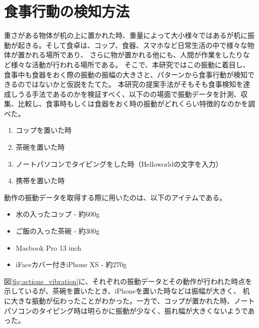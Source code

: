 \section{食事行動の検知方法}

重さがある物体が机の上に置かれた時、重量によって大小様々ではあるが机に振動が起きる。そして食卓は、コップ、食器、スマホなど日常生活の中で様々な物体が置かれる場所であり、
さらに物が置かれる他にも、人間が作業をしたりなど様々な活動が行われる場所である。
そこで、本研究ではこの振動に着目し、食事中も食器をおく際の振動の振幅の大きさと、パターンから食事行動が検知できるのではないかと仮説をたてた。
本研究の提案手法がそもそも食事検知を達成しうる手法であるのかを検証すべく、以下のの場面で振動データを計測、収集、比較し、食事時もしくは食器をおく時の振動がどれくらい特徴的なのかを調べた。

\begin{enumerate}
  \item コップを置いた時
  \item 茶碗を置いた時
  \item ノートパソコンでタイピングをした時（Helloworldの文字を入力）
  \item 携帯を置いた時
\end{enumerate}

動作の振動データを取得する際に用いたのは、以下のアイテムである。

\begin{itemize}
  \item 水の入ったコップ - 約600g
  \item ご飯の入った茶碗 - 約300g
  \item Macbook Pro 13 inch
  \item iFaceカバー付きiPhone XS - 約270g
\end{itemize}

図\ref{fig:actions_vibration}に、それぞれの振動データとその動作が行われた時点を示しているが、茶碗を置いたとき、iPhoneを置いた時などは振幅が大きく、
机に大きな振動が伝わったことがわかった。一方で、コップが置かれた時、ノートパソコンのタイピング時は明らかに振動が少なく、振れ幅が大きくないようであった。

